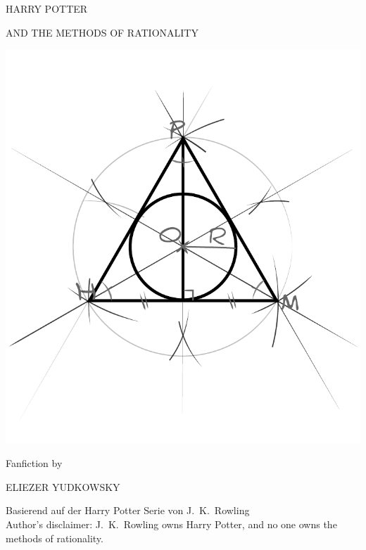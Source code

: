 \begin{center}
\thispagestyle{empty}
{\hpfont
\Huge\MakeUppercase{Harry Potter}\vspace*{0.5cm}

\Large\MakeUppercase{and the Methods of Rationality} %

\includegraphics[scale=0.5]{bubble.pdf}

\vspace*{-1.0cm}
\Large Fanfiction by \vspace*{.25cm}

\huge \MakeUppercase{Eliezer Yudkowsky}%

\normalsize

\vspace*{1\baselineskip}
\fullvolumetitle{\volumenumber}
}

\vspace{0.7cm}

Basierend auf der Harry Potter Serie von J.~K.~Rowling\\
Author's disclaimer: J.~K.~Rowling owns Harry Potter, and no one owns the methods of rationality.


\end{center}

